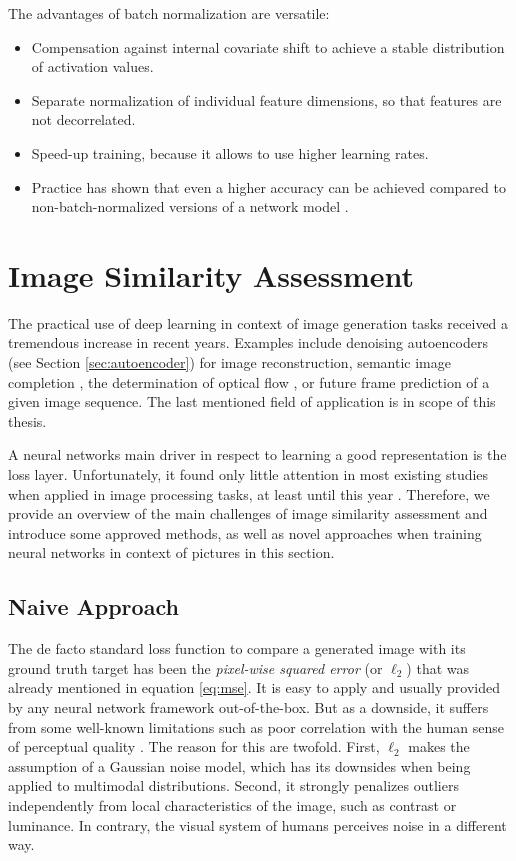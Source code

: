 The advantages of batch normalization are versatile:

\begin{itemize}
\item Compensation against internal covariate shift to achieve a stable distribution of activation values.
\item Separate normalization of individual feature dimensions, so that features are not decorrelated.
\item Speed-up training, because it allows to use higher learning rates.
\item Practice has shown that even a higher accuracy can be achieved compared to non-batch-normalized versions of a network model \parencite[p. 7]{batchnorm}.
\end{itemize}


\section{Image Similarity Assessment}

The practical use of deep learning in context of image generation tasks received a tremendous increase in recent years. Examples include denoising autoencoders (see Section \ref{sec:autoencoder}) for image reconstruction, semantic image completion \parencite{sem-img-inpainting}, the determination of optical flow \parencite{flownet}, \parencite{flow-static-img} or future  frame prediction of a given image sequence. The last mentioned field of application is in scope of this thesis. 

A neural networks main driver in respect to learning a good representation is the loss layer. Unfortunately, it found only little attention in most existing studies when applied in image processing tasks, at least until this year \parencite{loss-func-img-proc}. Therefore, we provide an overview of the main challenges of image similarity assessment and introduce some approved methods, as well as novel approaches when training neural networks in context of pictures in this section.


\subsection{Naive Approach}

The de facto standard loss function to compare a generated image with its ground truth target has been the \textit{pixel-wise squared error} (or $ \ell_{2} $) that was already mentioned in equation \ref{eq:mse}. It is easy to apply and usually provided by any neural network framework out-of-the-box. But as a downside, it suffers from some well-known limitations such as poor correlation with the human sense of perceptual quality \parencite{loss-func-img-proc}. The reason for this are twofold. First, $ \ell_{2} $ makes the assumption of a Gaussian noise model, which has its downsides when being applied to multimodal distributions. Second, it strongly penalizes outliers independently from local characteristics of the image, such as contrast or luminance. In contrary, the visual system of humans perceives noise in a different way.

